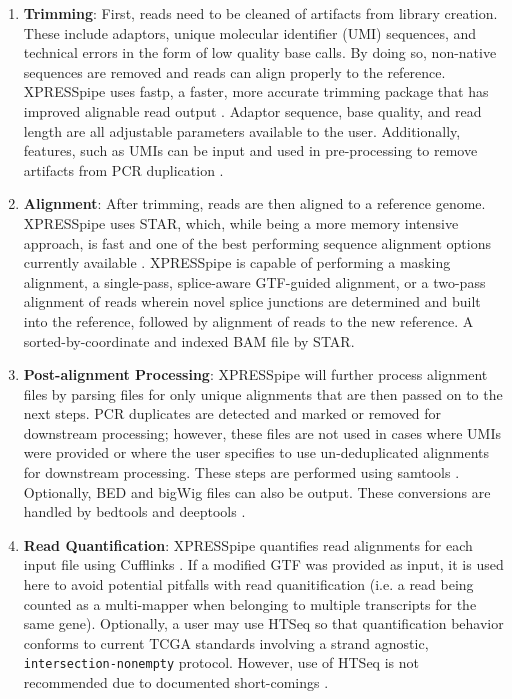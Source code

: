 \documentclass[11pt, a4paper, oneside]{article}
\begin{document}
\begin{enumerate}
  \item \textbf{Trimming}: First, reads need to be cleaned of artifacts from library creation. These include adaptors, unique molecular identifier (UMI) sequences, and technical errors in the form of low quality base calls. By doing so, non-native sequences are removed and reads can align properly to the reference. XPRESSpipe uses fastp, a faster, more accurate trimming package that has improved alignable read output \cite{fastp}. Adaptor sequence, base quality, and read length are all adjustable parameters available to the user. Additionally, features, such as UMIs can be input and used in pre-processing to remove artifacts from PCR duplication \cite{umi}.
  \item \textbf{Alignment}: After trimming, reads are then aligned to a reference genome. XPRESSpipe uses STAR, which, while being a more memory intensive approach, is fast and one of the  best performing sequence alignment options currently available \cite{star, baruzzo_natmeth}. XPRESSpipe is capable of performing a masking alignment, a single-pass, splice-aware GTF-guided alignment, or a two-pass alignment of reads wherein novel splice junctions are determined and built into the reference, followed by alignment of reads to the new reference. A sorted-by-coordinate and indexed BAM file by STAR.
  \item \textbf{Post-alignment Processing}: XPRESSpipe will further process alignment files by parsing files for only unique alignments that are then passed on to the next steps. PCR duplicates are detected and marked or removed for downstream processing; however, these files are not used in cases where UMIs were provided or where the user specifies to use un-deduplicated alignments for downstream processing. These steps are performed using samtools \cite{samtools}. Optionally, BED and bigWig files can also be output. These conversions are handled by bedtools \cite{bedtools} and deeptools \cite{deeptools}.
  \item \textbf{Read Quantification}: XPRESSpipe quantifies read alignments for each input file using Cufflinks \cite{cufflinks, count_benchmark}. If a modified GTF was provided as input, it is used here to avoid potential pitfalls with read quanitification (i.e. a read being counted as a multi-mapper when belonging to multiple transcripts for the same gene). Optionally, a user may use HTSeq \cite{htseq} so that quantification behavior conforms to current TCGA standards involving a strand agnostic, \texttt{intersection-nonempty} protocol. However, use of HTSeq is not recommended due to documented short-comings \cite{count_benchmark}.

\end{enumerate}
\end{document}

